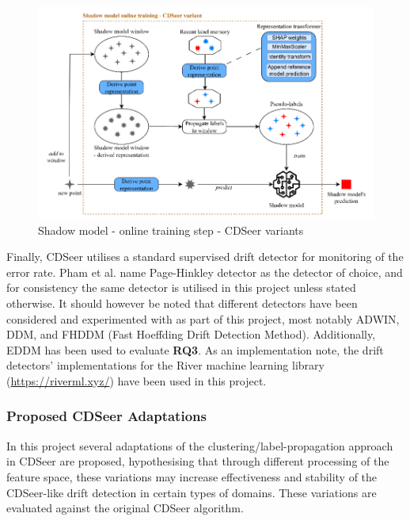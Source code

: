 \documentclass{svproc}
\begin{document}
\begin{figure}
	\centering
	\includegraphics[scale=.6]{figures/Fig5_CDSeerVariantSchema.png}
	\caption{Shadow model - online training step - CDSeer variants}
	\label{fig:fig5}
\end{figure}

Finally, CDSeer utilises a standard supervised drift detector for monitoring of the error rate. Pham et al. \cite{pham2025} name Page-Hinkley detector as the detector of choice, and for consistency the same detector is utilised in this project unless stated otherwise. It should however be noted that different detectors have been considered and experimented with as part of this project, most notably ADWIN, DDM, and FHDDM (Fast Hoeffding Drift Detection Method). Additionally, EDDM \cite{baena2006} has been used to evaluate \textbf{RQ3}. As an implementation note, the drift detectors’ implementations for the River machine learning library (\url{https://riverml.xyz/}) have been used in this project.




\subsubsection{Proposed CDSeer Adaptations}In this project several adaptations of the clustering/label-propagation approach in CDSeer are proposed, hypothesising that through different processing of the feature space, these variations may increase effectiveness and stability of the CDSeer-like drift detection in certain types of domains. These variations are evaluated against the original CDSeer algorithm.
\end{document}
